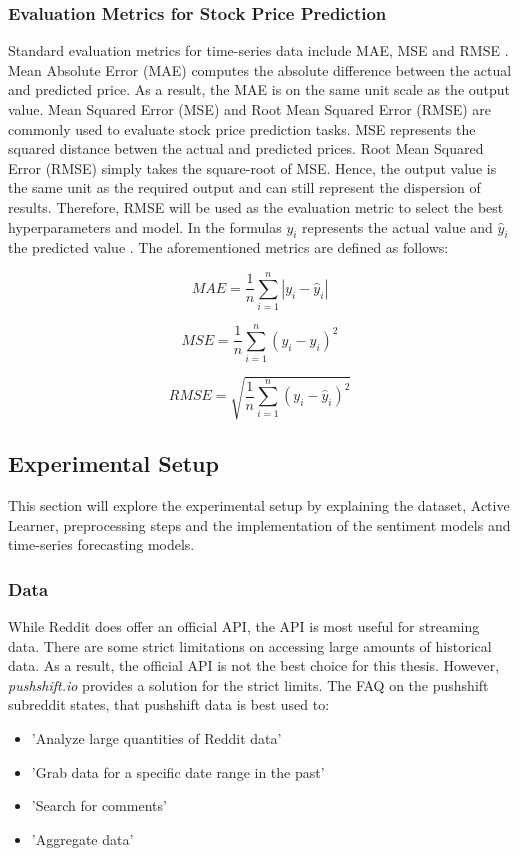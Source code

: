 \documentclass[11pt, a4paper]{article}
\begin{document}
\subsubsection{Evaluation Metrics for Stock Price Prediction}
Standard evaluation metrics for time-series data include MAE, MSE and RMSE \citep{rezaei2021stockpriceprediction}.
Mean Absolute Error (MAE) computes the absolute difference between the actual and predicted price. As a result, the MAE is on the same unit scale as
the output value.
Mean Squared Error (MSE) and Root Mean Squared Error (RMSE) are commonly used to evaluate stock price prediction tasks. MSE represents the squared distance
betwen the actual and predicted prices.
Root Mean Squared Error (RMSE) simply takes the square-root of MSE. Hence, the output value is the same unit as the required output and can still represent the
dispersion of results. Therefore, RMSE will be used as the evaluation metric to select the best hyperparameters and model.
In the formulas $y_{i}$ represents the actual value and $\hat{y}_i$ the predicted value \citep{chen2021meanvariance}.
The aforementioned metrics are defined as follows:

\begin{equation*}
    MAE = \frac{1}{n}\sum_{i=1}^{n}|y_{i}-\hat{y}_{i}|
\end{equation*}

\begin{equation*}
    MSE = \frac{1}{n}\sum_{i=1}^{n}(y_{i}-\hat{y}_{i})^2
\end{equation*}

\begin{equation*}
    RMSE = \sqrt{\frac{1}{n}\sum_{i=1}^{n}(y_{i}-\hat{y}_{i})^2}
\end{equation*}


\subsection{Experimental Setup}
This section will explore the experimental setup by explaining the dataset, Active Learner, preprocessing steps and the implementation of the
sentiment models and time-series forecasting models.

\subsubsection{Data}

While Reddit does offer an official API, the API is most useful for streaming data. 
There are some strict limitations on accessing large amounts of historical data. As a result, the official API is not the best choice for this thesis. 
However, \emph{pushshift.io} provides a solution for the strict limits.
The FAQ on the pushshift subreddit states, that pushshift data is best used to:
\begin{itemize}
    \item 'Analyze large quantities of Reddit data'
    \item 'Grab data for a specific date range in the past'
    \item 'Search for comments'
    \item 'Aggregate data'
\end{itemize}
\end{document}
